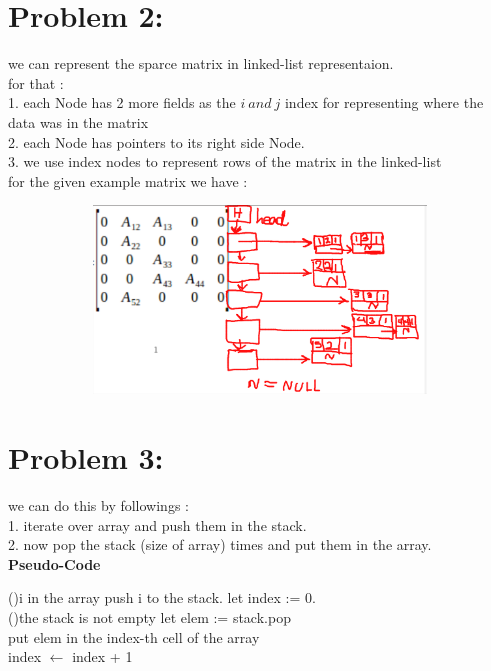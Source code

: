 \documentclass{report}
\begin{document}
    \section*{Problem 2:}
        we can represent the sparce matrix in linked-list representaion.\\
        for that :\\
            1. each Node has 2 more fields as the $i\ and\ j$ index for representing where the data was in the matrix\\ 
            2. each Node has pointers to its right side Node.\\
            3. we use index nodes to represent rows of the matrix in the linked-list\\
        for the given example matrix we have : \\
        \begin{figure}[hbt!]
            \centering
            \includegraphics[height = 50mm,width = 120mm]{p2.png}
        \end{figure}
    \section*{Problem 3:}
        we can do this by followings :\\
        1. iterate over array and push them in the stack.\\
        2. now pop the stack (size of array) times and put them in the array.\\
        \textbf{Pseudo-Code}
        \begin{algorithm}
            \For(){i in the array}{
                push i to the stack.
            }
            let index := 0.\\
            \While(){the stack is not empty}{
                let elem := stack.pop\\
                put elem in the index-th cell of the array\\
                index $\gets$ index + 1
            }
        \end{algorithm}
\end{document}
